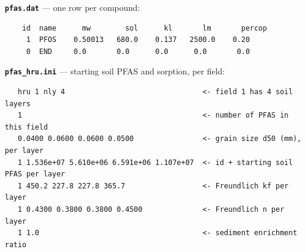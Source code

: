 \documentclass[12pt]{article}
\begin{document}
\noindent\textbf{\texttt{pfas.dat}} --- one row per compound:
\begin{verbatim}
    id  name      mw        sol      kl       lm       percop
     1  PFOS    0.50013   680.0    0.137   2500.0    0.20
     0  END     0.0       0.0      0.0      0.0       0.0
\end{verbatim}
\textbf{\texttt{pfas\_hru.ini}} --- starting soil PFAS and sorption, per field:
\begin{verbatim}
   hru 1 nly 4                                <- field 1 has 4 soil layers
   1                                          <- number of PFAS in this field
   0.0400 0.0600 0.0600 0.0500                <- grain size d50 (mm), per layer
   1 1.536e+07 5.610e+06 6.591e+06 1.107e+07  <- id + starting soil PFAS per layer
   1 450.2 227.8 227.8 365.7                  <- Freundlich kf per layer
   1 0.4300 0.3800 0.3800 0.4500              <- Freundlich n per layer
   1 1.0                                      <- sediment enrichment ratio
\end{verbatim}

\end{document}
